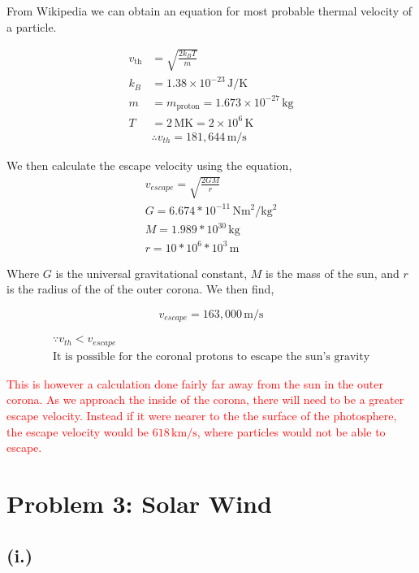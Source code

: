 \documentclass[11pt]{article}
\begin{document}
From Wikipedia we can obtain an equation for most probable thermal velocity
of a particle.

\[
\begin{aligned}
v_{\mathrm{th}} &= \sqrt{\frac{2k_B T}{m}} \\[4pt]
k_B &= 1.38 \times 10^{-23}\,\mathrm{J/K} \\[4pt]
m &= m_{\mathrm{proton}} = 1.673 \times 10^{-27}\,\mathrm{kg} \\[4pt]
T &= 2\,\mathrm{MK} = 2 \times 10^6\,\mathrm{K} \\
&\boxed{\therefore v_{th} = 181,644 \, \mathrm{m/s}}
\end{aligned}
\]

We then calculate the escape velocity using the equation,
\[
\begin{aligned}
v_{escape} = \sqrt{ \frac{2GM}{r} } \\
G = 6.674*10^{-11} \, \mathrm{Nm^2/kg^2} \\
M = 1.989*10^{30} \, \mathrm{kg} \\
r = 10*10^{6}*10^3 \, \mathrm{m}
\end{aligned}
\]

Where $G$ is the universal gravitational constant, $M$ is
the mass of the sun, and $r$ is the radius of the of the outer
corona. We then find,

\[
\boxed{v_{escape} = 163,000 \, \mathrm{m/s}}
\]

\[
\begin{gathered}
\because v_{th} < v_{escape} \\
\boxed{\text{It is possible for the coronal protons to escape the sun's gravity}}
\end{gathered}
\]

\textcolor{red}{This is however a calculation done fairly far away from 
the sun in the outer corona. As we approach the inside of the corona, there
will need to be a greater escape velocity. Instead if it were nearer to the the
surface of the photosphere, the escape velocity would be $618 \, \mathrm{km/s}$,
where particles would not be able to escape.}

\section*{Problem 3: Solar Wind}

\subsection*{(i.)}
\end{document}
